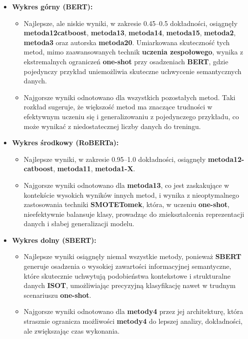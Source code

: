 \begin{itemize}
	\item \textbf{Wykres górny (BERT):}
	      \begin{itemize}
		      \item Najlepsze, ale niskie wyniki, w zakresie 0.45--0.5 dokładności, osiągnęły \textbf{metoda12\-catboost}, \textbf{metoda13}, \textbf{metoda14}, \textbf{metoda15}, \textbf{metoda2}, \textbf{metoda3} oraz autorska \textbf{metoda20}. Umiarkowana skuteczność tych metod, mimo zaawansowanych technik \textbf{uczenia zespołowego}, wynika z ekstremalnych ograniczeń \textbf{one-shot} przy osadzeniach \textbf{BERT}, gdzie pojedynczy przykład uniemożliwia skuteczne uchwycenie semantycznych danych.
		      \item Najgorsze wyniki odnotowano dla wszystkich pozostałych metod. Taki rozkład sugeruje, że większość metod ma znaczące trudności w efektywnym uczeniu się i generalizowaniu z pojedynczego przykładu, co może wynikać z niedostatecznej liczby danych do treningu.
	      \end{itemize}

	\item \textbf{Wykres środkowy (RoBERTa):}
	      \begin{itemize}
		      \item Najlepsze wyniki, w zakresie 0.95--1.0 dokładności, osiągnęły \textbf{metoda12-catboost}, \textbf{metoda11}, \textbf{metoda1-X}.
		      \item Najgorsze wyniki odnotowano dla \textbf{metoda13}, co jest zaskakujące w kontekście wysokich wyników innych metod, i wynika z nieoptymalnego zastosowania techniki \textbf{SMOTETomek}, która, w uczeniu \textbf{one-shot}, nieefektywnie balansuje klasy, prowadząc do zniekształcenia reprezentacji danych i słabej generalizacji modelu.
	      \end{itemize}

	\item \textbf{Wykres dolny (SBERT):}
	      \begin{itemize}
		      \item Najlepsze wyniki osiągnęły niemal wszystkie metody, ponieważ \textbf{SBERT} generuje osadzenia o wysokiej zawartości informacyjnej semantyczne, które skutecznie uchwytują podobieństwa kontekstowe i strukturalne danych \textbf{ISOT}, umożliwiając precyzyjną klasyfikację nawet w trudnym scenariuszu \textbf{one-shot}.
		      \item Najgorsze wyniki odnotowano dla \textbf{metody4} przez jej architekturę, która strasznie ogranicza możliwości \textbf{metody4} do lepszej analizy, dokładności, ale zwiększając czas wykonania.
	      \end{itemize}
\end{itemize}

